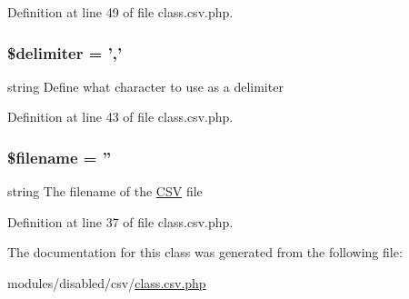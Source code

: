 Definition at line 49 of file class.\-csv.\-php.

\hypertarget{class_c_s_v_a40acc7b8c08cfbb456cd9444cb0e8f61}{
\subsubsection[{\$delimiter}]{\setlength{\rightskip}{0pt plus 5cm}\$delimiter = ','}}\label{class_c_s_v_a40acc7b8c08cfbb456cd9444cb0e8f61}
string Define what character to use as a delimiter 

Definition at line 43 of file class.\-csv.\-php.

\hypertarget{class_c_s_v_a0722441477f957078ee2437054556cbc}{
\subsubsection[{\$filename}]{\setlength{\rightskip}{0pt plus 5cm}\$filename = ''}}\label{class_c_s_v_a0722441477f957078ee2437054556cbc}
string The filename of the \hyperlink{class_c_s_v}{C\-S\-V} file 

Definition at line 37 of file class.\-csv.\-php.



The documentation for this class was generated from the following file\-:\begin{DoxyCompactItemize}
\item 
modules/disabled/csv/\hyperlink{class_8csv_8php}{class.\-csv.\-php}\end{DoxyCompactItemize}
